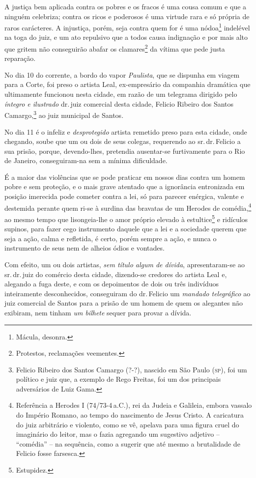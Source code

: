 A justiça bem aplicada contra os pobres e os fracos é uma cousa comum e
que a ninguém celebriza; contra os ricos e poderosos é uma virtude rara
e só própria de raros carácteres. A injustiça, porém, seja contra quem
for é uma nódoa\footnote{ Mácula, desonra.} indelével na toga do juiz,
e um ato repulsivo que a todos causa indignação e por mais alto que
gritem não conseguirão abafar os clamares\footnote{ Protestos,
  reclamações veementes.} da vítima que pede justa reparação.

No dia 10 do corrente, a bordo do vapor \emph{Paulista}, que se dispunha
em viagem para a Corte, foi preso o artista Leal, ex-empresário da
companhia dramática que ultimamente funcionou nesta cidade, em razão de
um telegrama dirigido pelo \emph{íntegro e ilustrado} dr.\,juiz comercial
desta cidade, Felicio Ribeiro dos Santos Camargo,\footnote{ Felicio
  Ribeiro dos Santos Camargo (?-?), nascido em São Paulo (\textsc{sp}), foi um
  político e juiz que, a exemplo de Rego Freitas, foi um dos principais
  adversários de Luiz Gama.} ao juiz municipal de Santos.

No dia 11 é o infeliz e \emph{desprotegido} artista remetido preso para
esta cidade, onde chegando, soube que um ou dois de seus colegas,
requerendo ao sr.\,dr.\,Felicio a sua prisão, porque, devendo-lhes,
pretendia ausentar-se furtivamente para o Rio de Janeiro, conseguiram-na
sem a mínima dificuldade.

É a maior das violências que se pode praticar em nossos dias contra um
homem pobre e sem proteção, e o mais grave atentado que a ignorância
entronizada em posição imerecida pode cometer contra a lei, só para
parecer enérgica, valente e destemida perante quem ri-se à surdina das
bravatas de um Herodes de comédia,\footnote{ Referência a Herodes I
  (74/73-4\,a.C.), rei da Judeia e Galileia, embora vassalo do
  Império Romano, ao tempo do nascimento de Jesus Cristo. A caricatura
  do juiz arbitrário e violento, como se vê, apelava para uma figura
  cruel do imaginário do leitor, mas o fazia agregando um sugestivo
  adjetivo -- ``comédia'' -- na sequência, como a sugerir que até mesmo a
  brutalidade de Felicio fosse farsesca.} ao mesmo tempo que
lisongeia-lhe o amor próprio elevado à estultice\footnote{ Estupidez.}
e ridículos supinos, para fazer cego instrumento daquele que a lei e a
sociedade querem que seja a ação, calma e refletida, é certo, porém
sempre a ação, e nunca o instrumento de seus nem de alheios ódios e
vontades.

Com efeito, um ou dois artistas, \emph{sem título algum de dívida},
apresentaram-se ao sr.\,dr.\,juiz do comércio desta cidade, dizendo-se
credores do artista Leal e, alegando a fuga deste, e com os depoimentos
de dois ou três indivíduos inteiramente desconhecidos, conseguiram do
dr.\,Felicio um \emph{mandado telegráfico} ao juiz comercial de Santos
para a prisão de um homem de quem os alegantes não exibiram, nem tinham
\emph{um bilhete} sequer para provar a dívida.

